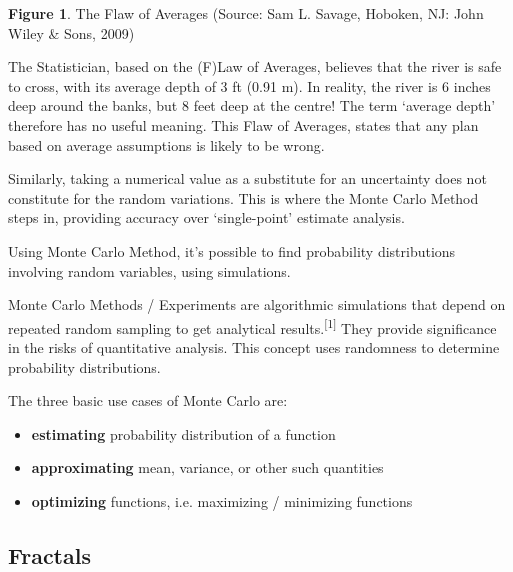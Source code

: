\documentclass{resonance}
\begin{document}
\scriptsize{\textbf{Figure 1}. The Flaw of Averages (Source: Sam L. Savage, Hoboken, NJ: John Wiley \& Sons, 2009)}

\pagebreak 

The Statistician, based on the (F)Law of Averages, believes that the river is safe to cross, with its average depth of 3 ft (0.91 m). In reality, the river is 6 inches deep around the banks, but 8 feet deep at the centre! The term ‘average depth’ therefore has no useful meaning. This Flaw of Averages, states that any plan based on average assumptions is likely to be wrong.

Similarly, taking a numerical value as a substitute for an uncertainty does not constitute for the random variations. This is where the Monte Carlo Method steps in, providing accuracy over ‘single-point' estimate analysis.

Using Monte Carlo Method, it's possible to find probability distributions involving random variables, using simulations.

Monte Carlo Methods / Experiments are algorithmic simulations that depend on repeated random sampling to get analytical results.\textsuperscript{[1]} They provide significance in the risks of quantitative analysis. This concept uses randomness to determine probability distributions.

The three basic use cases of Monte Carlo are:
\begin{itemize}
	\item \textbf{estimating} probability distribution of a function
	\item \textbf{approximating} mean, variance, or other such quantities
	\item \textbf{optimizing} functions, i.e. maximizing / minimizing functions
\end{itemize}

\subsection*{Fractals}

	
\end{document}

